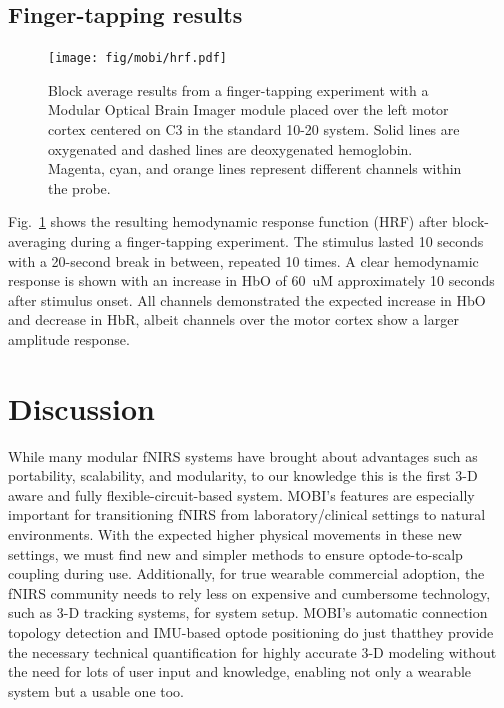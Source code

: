 \subsection{Finger-tapping results}
\begin{figure}
	\begin{center}
	\texttt{[image: fig/mobi/hrf.pdf]}
	\end{center}
	\caption{Block average results from a finger-tapping experiment with a Modular Optical Brain Imager module placed over the left motor cortex centered on C3 in the standard 10-20 system. Solid lines are oxygenated and dashed lines are deoxygenated hemoglobin. Magenta, cyan, and orange lines represent different channels within the probe.}
	\label{fig:hrf}
\end{figure} 
Fig.~\ref{fig:hrf} shows the resulting hemodynamic response function (HRF) after block-averaging during a finger-tapping experiment. The stimulus lasted 10 seconds with a 20-second break in between, repeated 10 times. A clear hemodynamic response is shown with an increase in HbO of 60~uM approximately 10 seconds after stimulus onset. All channels demonstrated the expected increase in HbO and decrease in HbR, albeit channels over the motor cortex show a larger amplitude response. 



\section{Discussion}
\label{chap:mobi:discussion}
While many modular \ac{fNIRS} systems have brought about advantages such as portability, scalability, and modularity, to our knowledge this is the first 3-D aware and fully flexible-circuit-based system. \ac{MOBI}'s features are especially important for transitioning \ac{fNIRS} from laboratory/clinical settings to natural environments. With the expected higher physical movements in these new settings, we must find new and simpler methods to ensure optode-to-scalp coupling during use. Additionally, for true wearable commercial adoption, the \ac{fNIRS} community needs to rely less on expensive and cumbersome technology, such as 3-D tracking systems, for system setup. \ac{MOBI}'s automatic connection topology detection and IMU-based optode positioning do just that\textemdash they provide the necessary technical quantification for highly accurate 3-D modeling without the need for lots of user input and knowledge, enabling not only a wearable system but a usable one too. 

